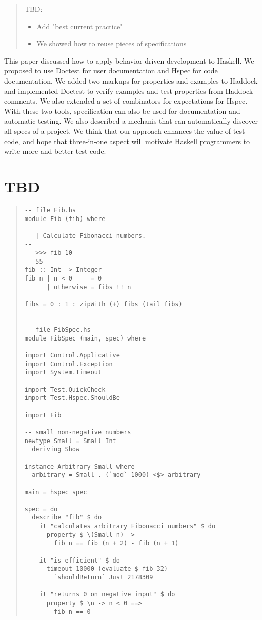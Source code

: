 \documentclass[preprint]{sigplanconf}
\begin{document}
\begin{quote}
TBD:
    \begin{itemize}
        \item Add "best current practice"
        \item We showed how to reuse pieces of specifications
    \end{itemize}
\end{quote}

This paper discussed how to apply behavior driven development to
Haskell.  We proposed to use Doctest for user documentation and Hspec
for code documentation. We added two markups for
properties and examples to Haddock and implemented
Doctest to verify examples and test properties from Haddock comments.
We also extended a set of combinators for expectations for Hspec.
With these two tools, specification can also be
used for documentation and automatic testing.  We also described a
mechanis that can automatically discover all specs of a project.  We
think that our approach enhances the value of test code, and hope
that three-in-one aspect will motivate Haskell programmers to write
more and better test code.

\appendix
\section{TBD}

\begin{quote}
\small
\begin{verbatim}
-- file Fib.hs
module Fib (fib) where

-- | Calculate Fibonacci numbers.
--
-- >>> fib 10
-- 55
fib :: Int -> Integer
fib n | n < 0     = 0
      | otherwise = fibs !! n

fibs = 0 : 1 : zipWith (+) fibs (tail fibs)


-- file FibSpec.hs
module FibSpec (main, spec) where

import Control.Applicative
import Control.Exception
import System.Timeout

import Test.QuickCheck
import Test.Hspec.ShouldBe

import Fib

-- small non-negative numbers
newtype Small = Small Int
  deriving Show

instance Arbitrary Small where
  arbitrary = Small . (`mod` 1000) <$> arbitrary

main = hspec spec

spec = do
  describe "fib" $ do
    it "calculates arbitrary Fibonacci numbers" $ do
      property $ \(Small n) ->
        fib n == fib (n + 2) - fib (n + 1)

    it "is efficient" $ do
      timeout 10000 (evaluate $ fib 32)
        `shouldReturn` Just 2178309

    it "returns 0 on negative input" $ do
      property $ \n -> n < 0 ==>
        fib n == 0
\end{verbatim}
\end{quote}
\end{document}
